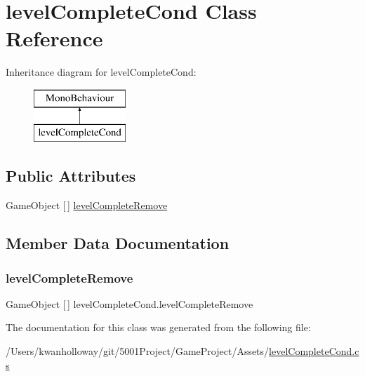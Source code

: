 \hypertarget{classlevel_complete_cond}{}\section{level\+Complete\+Cond Class Reference}
\label{classlevel_complete_cond}
Inheritance diagram for level\+Complete\+Cond\+:\begin{figure}[H]
\begin{center}
\leavevmode
\includegraphics[height=2.000000cm]{classlevel_complete_cond}
\end{center}
\end{figure}
\subsection*{Public Attributes}
\begin{DoxyCompactItemize}
\item 
Game\+Object \mbox{[}$\,$\mbox{]} \hyperlink{classlevel_complete_cond_adf0e456569f3f5ccd52212147e98f743}{level\+Complete\+Remove}
\end{DoxyCompactItemize}


\subsection{Member Data Documentation}
\mbox{\label{classlevel_complete_cond_adf0e456569f3f5ccd52212147e98f743}} 
\subsubsection{\texorpdfstring{level\+Complete\+Remove}{levelCompleteRemove}}
{\footnotesize\ttfamily Game\+Object \mbox{[}$\,$\mbox{]} level\+Complete\+Cond.\+level\+Complete\+Remove}



The documentation for this class was generated from the following file\+:\begin{DoxyCompactItemize}
\item 
/\+Users/kwanholloway/git/5001\+Project/\+Game\+Project/\+Assets/\hyperlink{level_complete_cond_8cs}{level\+Complete\+Cond.\+cs}\end{DoxyCompactItemize}
